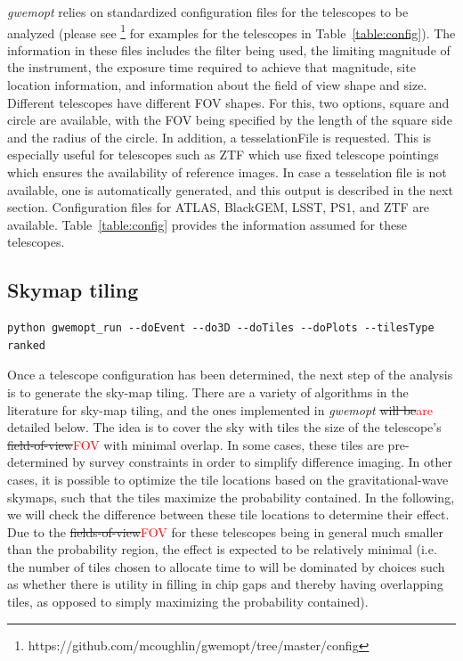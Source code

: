 \documentclass[twocolumn]{aastex62}
\begin{document}
\emph{gwemopt} relies on standardized configuration files for the telescopes to be analyzed (please see \footnote{https://github.com/mcoughlin/gwemopt/tree/master/config} for examples for the telescopes in Table~\ref{table:config}). 
The information in these files includes the filter being used, the limiting magnitude of the instrument, the exposure time required to achieve that magnitude, site location information, and information about the field of view shape and size. 
Different telescopes have different FOV shapes.
For this, two options, square and circle are available, with the FOV being specified by the length of the square side and the radius of the circle. In addition, a tesselationFile is requested. This is especially useful for telescopes such as ZTF which use fixed telescope pointings which ensures the availability of reference images. In case a tesselation file is not available, one is automatically generated, and this output is described in the next section.
Configuration files for ATLAS, BlackGEM, LSST, PS1, and ZTF are available.
Table~\ref{table:config} provides the information assumed for these telescopes.\\

\subsection{Skymap tiling}
\label{subsection:tiling}
\begin{lstlisting}
python gwemopt_run --doEvent --do3D --doTiles --doPlots --tilesType ranked
\end{lstlisting}
Once a telescope configuration has been determined, the next step of the analysis is to generate the sky-map tiling.
There are a variety of algorithms in the literature for sky-map tiling, and the ones implemented in \emph{gwemopt} \sout{will be}\textcolor{red}{are} detailed below. The idea is to cover the sky with tiles the size of the telescope's \sout{field-of-view}\textcolor{red}{FOV} with minimal overlap. In some cases, these tiles are pre-determined by survey constraints in order to simplify difference imaging. In other cases, it is possible to optimize the tile locations based on the gravitational-wave skymaps, such that the tiles maximize the probability contained. In the following, we will check the difference between these tile locations to determine their effect. Due to the \sout{fields-of-view}\textcolor{red}{FOV} for these telescopes being in general much smaller than the probability region, the effect is expected to be relatively minimal (i.e. the number of tiles chosen to allocate time to will be dominated by choices such as whether there is utility in filling in chip gaps and thereby having overlapping tiles, as opposed to simply maximizing the probability contained).
\end{document}
